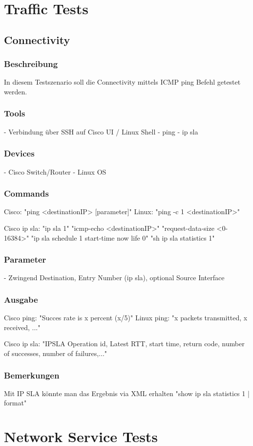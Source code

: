 \documentclass[a4,12pt]{scrartcl}
\begin{document}
\newpage
\section{Traffic Tests}
\subsection{Connectivity}
\subsubsection{Beschreibung}
In diesem Testszenario soll die Connectivity mittels ICMP ping Befehl getestet werden.
\subsubsection{Tools}
- Verbindung über SSH auf Cisco UI / Linux Shell
- ping
- ip sla

\subsubsection{Devices}
- Cisco Switch/Router
- Linux OS
\subsubsection{Commands}
Cisco: "ping <destinationIP> [parameter]"
Linux: "ping -c 1 <destinationIP>"

Cisco ip sla: 	"ip sla 1"
			 	"icmp-echo <destinationIP>"
			  	"request-data-size <0-16384>"
			  	"ip sla schedule 1 start-time now life 0"
			  	"sh ip sla statistics 1"

\subsubsection{Parameter}
- Zwingend Destination, Entry Number (ip sla), optional Source Interface
\subsubsection{Ausgabe}
Cisco ping: "Succes rate is x percent (x/5)"
Linux ping: "x packets transmitted, x received, ..."

Cisco ip sla: "IPSLA Operation id, Latest RTT, start time, return code, number of successes, number of failures,..."

\subsubsection{Bemerkungen}
Mit IP SLA könnte man das Ergebnis via XML erhalten
"show ip sla statistics 1 | format"
\newpage
\section{Network Service Tests}
\end{document}
